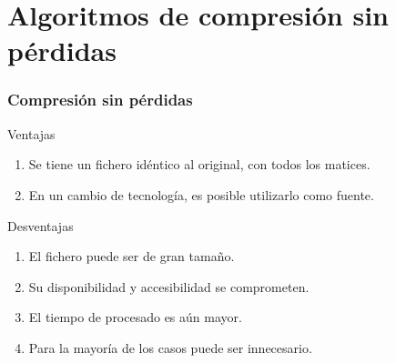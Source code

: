 \documentclass{beamer}
\begin{document}
\section{Algoritmos de compresión sin pérdidas}
\begin{frame}
    \frametitle{Compresión sin pérdidas}
    \centering
    \begin{exampleblock}{Ventajas}
        \begin{enumerate}
            \item Se tiene un fichero idéntico al original, con todos los matices.
            \item En un cambio de tecnología, es posible utilizarlo como fuente.
        \end{enumerate}
    \end{exampleblock}
    \begin{block}{Desventajas}
        \begin{enumerate}
            \item El fichero puede ser de gran tamaño.
            \item Su disponibilidad y accesibilidad se comprometen.
            \item El tiempo de procesado es aún mayor.
            \item Para la mayoría de los casos puede ser innecesario.
        \end{enumerate}
    \end{block}
\end{frame}
\end{document}

